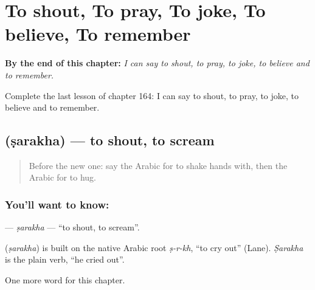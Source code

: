 
\chapter{To shout, To pray, To joke, To believe, To remember}
\label{ch:ar-to-shout-to-pray-to-joke-to-believe-to-remember}

\begin{chapteropening}
\textbf{By the end of this chapter:} \emph{I can say to shout, to pray, to joke, to believe and to remember.}

Complete the last lesson of chapter 164: I can say to shout, to pray, to joke, to believe and to remember.
\end{chapteropening}

\section[\texorpdfstring{\ar{صرخ} (ṣarakha)}{صرخ (ṣarakha)}]{ (ṣarakha) — to shout, to scream}

\label{lesson:AR-C164-sarakha}



\begin{quote}
Before the new one: say the Arabic for to shake hands with, then the Arabic for to hug.
\end{quote}

\subsection*{You'll want to know: }
\textbf{} — \emph{ṣarakha} — \textquotedblleft{}to shout, to scream\textquotedblright{}.

\begin{cousinweb}
\textbf{} (\emph{ṣarakha}) is built on the native Arabic root \emph{ṣ-r-kh}, \textquotedblleft{}to cry out\textquotedblright{} (Lane). \emph{Ṣarakha} is the plain verb, \textquotedblleft{}he cried out\textquotedblright{}.
\end{cousinweb}

\begin{grammarlens}[title={What you've built}]
One more word for this chapter.
\end{grammarlens}


